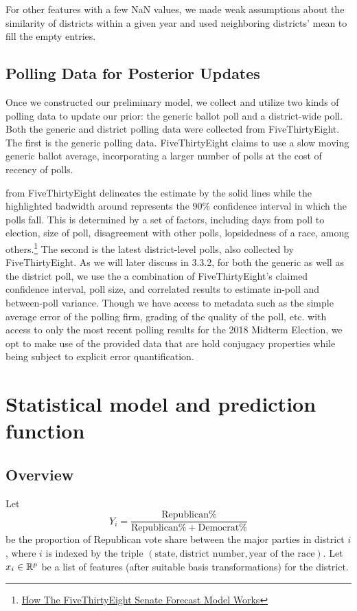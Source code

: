 \documentclass[11pt]{article}
\begin{document}
For other features with a few NaN values, we made weak assumptions about the similarity of districts within a given year and used neighboring districts' mean to fill the empty entries. 

\subsection{Polling Data for Posterior Updates}
Once we constructed our preliminary model, we collect and utilize two kinds of polling data to update our prior: the generic ballot poll and a district-wide poll. Both the generic and district polling data were collected from FiveThirtyEight. The first is the generic polling data. FiveThirtyEight claims to use a slow moving generic ballot average, incorporating a larger number of polls at the cost of recency of polls.

  from FiveThirtyEight delineates the estimate by the solid lines while the highlighted badwidth around represents the 90\% confidence interval in which the polls fall. This is determined by a set of factors, including days from poll to election, size of poll, disagreement with other polls, lopsidedness of a race, among others.\footnote{\href{https://fivethirtyeight.com/features/how-the-fivethirtyeight-senate-forecast-model-works/}{How The FiveThirtyEight Senate Forecast Model Works}} The second is the latest district-level polls, also collected by FiveThirtyEight. As we will later discuss in 3.3.2, for both the generic as well as the district poll, we use the a combination of FiveThirtyEight's claimed confidence interval, poll size, and correlated results to estimate in-poll and between-poll variance. Though we have access to metadata such as the simple average error of the polling firm, grading of the quality of the poll, etc. with access to only the most recent polling results for the 2018 Midterm Election, we opt to make use of the provided data that are hold conjugacy properties while being subject to explicit error quantification.

\section{Statistical model and prediction function}
\label{sec:model}
\subsection{Overview}
Let \[Y_i = \frac{\text{Republican}\% }{\text{Republican}\% + \text{Democrat}\%}\] be the proportion of Republican vote share between the major parties in district $i$, where $i$ is indexed by the triple $(\text{state}, \text{district number}, \text{year of the race})$.
Let $x_i\in \mathbb{R}^p$ be a list of features (after suitable basis transformations)
for the district. 
\end{document}
